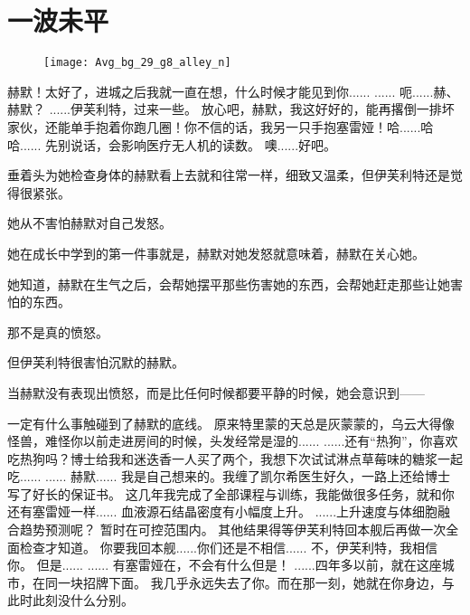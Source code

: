 \documentclass[openany]{book}
\begin{document}
\chapter{一波未平}
\begin{figure}[h]
    \centering
    \texttt{[image: Avg\_bg\_29\_g8\_alley\_n]}
\end{figure}
\begin{dialogue}
     赫默！太好了，进城之后我就一直在想，什么时候才能见到你......
     ......
     呃......赫、赫默？
     ......伊芙利特，过来一些。
     放心吧，赫默，我这好好的，能再撂倒一排坏家伙，还能单手抱着你跑几圈！你不信的话，我另一只手抱塞雷娅！哈......哈哈......
     先别说话，会影响医疗无人机的读数。
     噢......好吧。\par
    垂着头为她检查身体的赫默看上去就和往常一样，细致又温柔，但伊芙利特还是觉得很紧张。\par
    她从不害怕赫默对自己发怒。\par
    她在成长中学到的第一件事就是，赫默对她发怒就意味着，赫默在关心她。\par
    她知道，赫默在生气之后，会帮她摆平那些伤害她的东西，会帮她赶走那些让她害怕的东西。\par
    那不是真的愤怒。\par
    但伊芙利特很害怕沉默的赫默。\par
    当赫默没有表现出愤怒，而是比任何时候都要平静的时候，她会意识到——\par
    一定有什么事触碰到了赫默的底线。
     原来特里蒙的天总是灰蒙蒙的，乌云大得像怪兽，难怪你以前走进房间的时候，头发经常是湿的......
     ......还有“热狗”，你喜欢吃热狗吗？博士给我和迷迭香一人买了两个，我想下次试试淋点草莓味的糖浆一起吃......
     ......
     赫默......
     我是自己想来的。我缠了凯尔希医生好久，一路上还给博士写了好长的保证书。
     这几年我完成了全部课程与训练，我能做很多任务，就和你还有塞雷娅一样......
     血液源石结晶密度有小幅度上升。
     ......上升速度与体细胞融合趋势预测呢？
     暂时在可控范围内。
     其他结果得等伊芙利特回本舰后再做一次全面检查才知道。
     你要我回本舰......你们还是不相信......
     不，伊芙利特，我相信你。
     但是......
     ......
     有塞雷娅在，不会有什么但是！
     ......四年多以前，就在这座城市，在同一块招牌下面。
     我几乎永远失去了你。而在那一刻，她就在你身边，与此时此刻没什么分别。

\end{dialogue}
\end{document}
